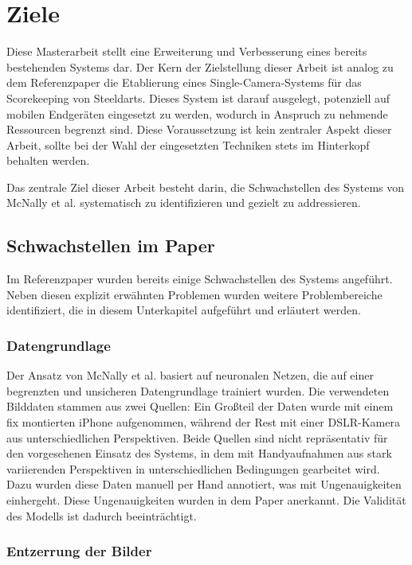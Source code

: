 \section{Ziele}
\label{sec:ziele}

Diese Masterarbeit stellt eine Erweiterung und Verbesserung eines bereits bestehenden Systems dar. Der Kern der Zielstellung dieser Arbeit ist analog zu dem Referenzpaper die Etablierung eines Single-Camera-Systems für das Scorekeeping von Steeldarts. Dieses System ist darauf ausgelegt, potenziell auf mobilen Endgeräten eingesetzt zu werden, wodurch in Anspruch zu nehmende Ressourcen begrenzt sind. Diese Voraussetzung ist kein zentraler Aspekt dieser Arbeit, sollte bei der Wahl der eingesetzten Techniken stets im Hinterkopf behalten werden.

Das zentrale Ziel dieser Arbeit besteht darin, die Schwachstellen des Systems von McNally et al. systematisch zu identifizieren und gezielt zu addressieren.

\subsection{Schwachstellen im Paper}
\label{sub:schwachstellen}

Im Referenzpaper wurden bereits einige Schwachstellen des Systems angeführt. Neben diesen explizit erwähnten Problemen wurden weitere Problembereiche identifiziert, die in diesem Unterkapitel aufgeführt und erläutert werden.

\subsubsection{Datengrundlage}
\label{sec:ziele:schwachstellen:datengrundlage}

Der Ansatz von McNally et al. basiert auf neuronalen Netzen, die auf einer begrenzten und unsicheren Datengrundlage trainiert wurden. Die verwendeten Bilddaten stammen aus zwei Quellen: Ein Großteil der Daten wurde mit einem fix montierten iPhone aufgenommen, während der Rest mit einer DSLR-Kamera aus unterschiedlichen Perspektiven. Beide Quellen sind nicht repräsentativ für den vorgesehenen Einsatz des Systems, in dem mit Handyaufnahmen aus stark variierenden Perspektiven in unterschiedlichen Bedingungen gearbeitet wird. Dazu wurden diese Daten manuell per Hand annotiert, was mit Ungenauigkeiten einhergeht. Diese Ungenauigkeiten wurden in dem Paper anerkannt. Die Validität des Modells ist dadurch beeinträchtigt.

\subsubsection{Entzerrung der Bilder}
\label{sec:ziele:schwachstellen:entzerrung}


